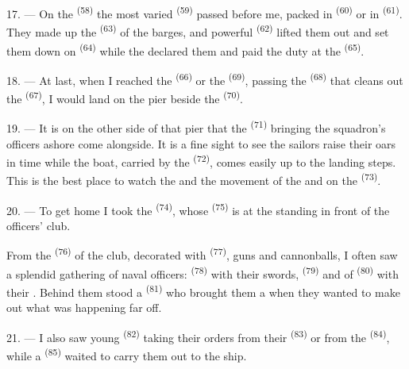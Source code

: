 17. --- On the  \textsuperscript{(58)} the most varied 
\textsuperscript{(59)} passed before me, packed in  \textsuperscript{(60)} or
in  \textsuperscript{(61)}. They made up the 
\textsuperscript{(63)} of the barges, and powerful  \textsuperscript{(62)}
lifted them out and set them down on  \textsuperscript{(64)} while the
 declared them and paid the duty at the 
\textsuperscript{(65)}.

18. --- At last, when I reached the  \textsuperscript{(66)} or the
 \textsuperscript{(69)}, passing the  \textsuperscript{(68)} that
cleans out the  \textsuperscript{(67)}, I would land on the pier beside the
 \textsuperscript{(70)}.

19. --- It is on the other side of that pier that the  \textsuperscript{(71)}
bringing the squadron's officers ashore come alongside. It is a fine sight to see the sailors
raise their oars in time while the boat, carried by the  \textsuperscript{(72)},
comes easily up to the landing steps. This is the best place to watch the  and
the movement of the  and  on the 
\textsuperscript{(73)}.

\VUsaut{3.0mm}
\VUsaut{3.0mm}

20. --- To get home I took the  \textsuperscript{(74)}, whose
 \textsuperscript{(75)} is at the  standing in front of the
officers' club.

From the  \textsuperscript{(76)} of the club, decorated with
 \textsuperscript{(77)}, guns and cannonballs, I often saw a splendid
gathering of naval officers:  \textsuperscript{(78)} with their swords,
 \textsuperscript{(79)} and of
 \textsuperscript{(80)} with their . Behind them stood
a  \textsuperscript{(81)} who brought them a  when they
wanted to make out what was happening far off.

21. --- I also saw young  \textsuperscript{(82)} taking their orders
from their  \textsuperscript{(83)} or from the
 \textsuperscript{(84)}, while a  \textsuperscript{(85)}
waited to carry them out to the ship.

